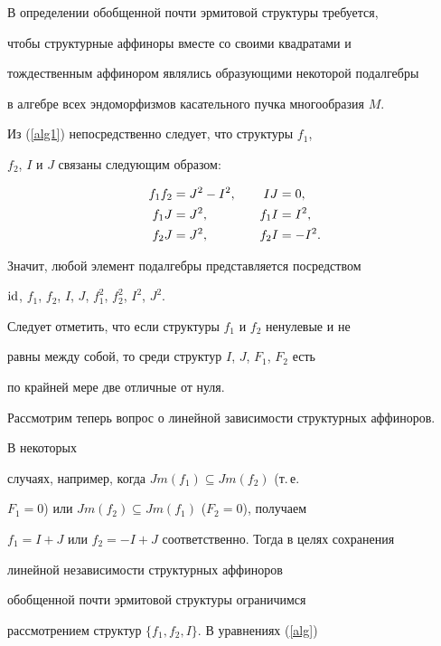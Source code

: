 В определении обобщенной почти эрмитовой структуры требуется,


чтобы структурные аффиноры вместе со своими квадратами и


тождественным аффинором являлись образующими некоторой подалгебры


в алгебре всех эндоморфизмов касательного пучка многообразия $M$.


Из (\ref{alg1}) непосредственно следует, что структуры $f_1$,


$f_2$, $I$ и $J$ связаны следующим образом:


\begin{alignat}{2}


f_1f_2&=J^2-I^2, &\quad IJ&=0,\notag \\


\label{alg}


f_1J&=J^2, &\quad f_1I&=I^2,\\


f_2J&=J^2, &\quad f_2I&=-I^2.\notag


\end{alignat}


Значит, любой элемент подалгебры представляется посредством


$\operatorname{id}$, $f_1$, $f_2$, $I$, $J$, $f_1^2$, $f_2^2$, $I^2$, $J^2$.





Следует отметить, что если структуры $f_1$ и $f_2$ ненулевые и не


равны между собой, то среди структур $I$, $J$, $F_1$, $F_2$ есть


по крайней мере две отличные от нуля.





Рассмотрим теперь вопрос о линейной зависимости структурных аффиноров.


В некоторых


случаях, например, когда $Jm(f_1)\subseteq Jm(f_2)$ (т.\,е.


$F_1=0$) или $Jm(f_2)\subseteq Jm(f_1)$ ($F_2=0$), получаем


$f_1=I+J$ или $f_2=-I+J$ соответственно. Тогда в целях сохранения


линейной независимости структурных аффиноров


обобщенной почти эрмитовой структуры ограничимся


рассмотрением структур $\{f_1,f_2,I\}$. В уравнениях (\ref{alg})


